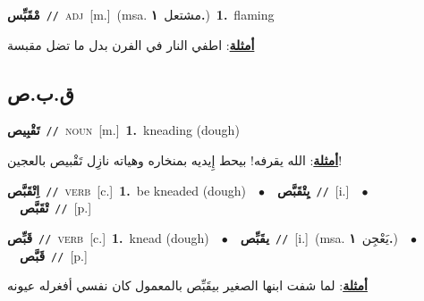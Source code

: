 \documentclass[10pt,a4paper,twoside]{article} %
\begin{document}
\begin{multicols}{2}
{{{{{{\setlength\topsep{0pt}\textbf{\foreignlanguage{arabic}{مْقَبِّس}}\ {\color{gray}\texttt{//}\color{black}}\ \textsc{adj}\ [m.]\ \color{gray}(msa. \foreignlanguage{arabic}{مشتعل}~\foreignlanguage{arabic}{\textbf{١.}})\color{black}\ \textbf{1.}~flaming\  \begin{flushright}\color{gray}\foreignlanguage{arabic}{\textbf{\underline{\foreignlanguage{arabic}{أمثلة}}}: اطفي النار في الفرن بدل ما تضل مقبسة}\end{flushright}\color{black}} \vspace{2mm}

\vspace{-3mm}
\subsection*{\color{blue}\foreignlanguage{arabic}{ق.ب.ص}\color{blue}{}} 

{\setlength\topsep{0pt}\textbf{\foreignlanguage{arabic}{تَقْبِيص}}\ {\color{gray}\texttt{//}\color{black}}\ \textsc{noun}\ [m.]\ \textbf{1.}~kneading (dough)\  \begin{flushright}\color{gray}\foreignlanguage{arabic}{\textbf{\underline{\foreignlanguage{arabic}{أمثلة}}}: الله يقرفه! بيحط إِيديه بمنخاره وهياته نازِل تَقْبيص بالعجين!}\end{flushright}\color{black}} \vspace{2mm}

{\setlength\topsep{0pt}\textbf{\foreignlanguage{arabic}{اِتْقَبَّص}}\ {\color{gray}\texttt{//}\color{black}}\ \textsc{verb}\ [c.]\ \textbf{1.}~be kneaded (dough)\ \ $\bullet$\ \ \setlength\topsep{0pt}\textbf{\foreignlanguage{arabic}{يِتْقَبَّص}}\ {\color{gray}\texttt{//}\color{black}}\ [i.]\ \ $\bullet$\ \ \setlength\topsep{0pt}\textbf{\foreignlanguage{arabic}{تْقَبَّص}}\ {\color{gray}\texttt{//}\color{black}}\ [p.]\ 

{\setlength\topsep{0pt}\textbf{\foreignlanguage{arabic}{قَبِّص}}\ {\color{gray}\texttt{//}\color{black}}\ \textsc{verb}\ [c.]\ \textbf{1.}~knead (dough)\ \ $\bullet$\ \ \setlength\topsep{0pt}\textbf{\foreignlanguage{arabic}{يقَبِّص}}\ {\color{gray}\texttt{//}\color{black}}\ [i.]\ \color{gray}(msa. \foreignlanguage{arabic}{يَعْجِن}~\foreignlanguage{arabic}{\textbf{١.}})\color{black}\ \ $\bullet$\ \ \setlength\topsep{0pt}\textbf{\foreignlanguage{arabic}{قَبَّص}}\ {\color{gray}\texttt{//}\color{black}}\ [p.]\  \begin{flushright}\color{gray}\foreignlanguage{arabic}{\textbf{\underline{\foreignlanguage{arabic}{أمثلة}}}: لما شفت ابنها الصغير بيقَبِّص بالمعمول كان نفسي أفغرله عيونه}\end{flushright}\color{black}} \vspace{2mm}

}}}}}}
\end{multicols}
\end{document}
